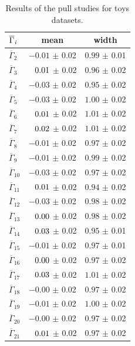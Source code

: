 \begin{table}[!tb]
\caption{Results of the pull studies for toys datasets.}
\centering
\begin{tabular}{l|c|c}
$\overline{\Gamma}_{\it{i}}$ & mean & width \\ 
\hline
$\overline{\Gamma}_{2}$ & $-0.01$ $\pm$ 0.02 & $0.99$ $\pm$ 0.01 \\ 
$\overline{\Gamma}_{3}$ & $\hphantom{-}0.01$ $\pm$ 0.02 & $0.96$ $\pm$ 0.02 \\ 
$\overline{\Gamma}_{4}$ & $-0.03$ $\pm$ 0.02 & $0.95$ $\pm$ 0.02 \\ 
$\overline{\Gamma}_{5}$ & $-0.03$ $\pm$ 0.02 & $1.00$ $\pm$ 0.02 \\ 
$\overline{\Gamma}_{6}$ & $\hphantom{-}0.01$ $\pm$ 0.02 & $1.01$ $\pm$ 0.02 \\ 
$\overline{\Gamma}_{7}$ & $\hphantom{-}0.02$ $\pm$ 0.02 & $1.01$ $\pm$ 0.02 \\ 
$\overline{\Gamma}_{8}$ & $-0.01$ $\pm$ 0.02 & $0.97$ $\pm$ 0.02 \\ 
$\overline{\Gamma}_{9}$ & $-0.01$ $\pm$ 0.02 & $0.99$ $\pm$ 0.02 \\ 
$\overline{\Gamma}_{10}$ & $-0.03$ $\pm$ 0.02 & $0.97$ $\pm$ 0.02 \\ 
$\overline{\Gamma}_{11}$ & $\hphantom{-}0.01$ $\pm$ 0.02 & $0.94$ $\pm$ 0.02 \\ 
$\overline{\Gamma}_{12}$ & $-0.03$ $\pm$ 0.02 & $0.98$ $\pm$ 0.02 \\ 
$\overline{\Gamma}_{13}$ & $\hphantom{-}0.00$ $\pm$ 0.02 & $0.98$ $\pm$ 0.02 \\ 
$\overline{\Gamma}_{14}$ & $\hphantom{-}0.03$ $\pm$ 0.02 & $0.95$ $\pm$ 0.01 \\ 
$\overline{\Gamma}_{15}$ & $-0.01$ $\pm$ 0.02 & $0.97$ $\pm$ 0.01 \\ 
$\overline{\Gamma}_{16}$ & $\hphantom{-}0.00$ $\pm$ 0.02 & $0.97$ $\pm$ 0.02 \\ 
$\overline{\Gamma}_{17}$ & $\hphantom{-}0.03$ $\pm$ 0.02 & $1.01$ $\pm$ 0.02 \\ 
$\overline{\Gamma}_{18}$ & $-0.00$ $\pm$ 0.02 & $0.97$ $\pm$ 0.02 \\ 
$\overline{\Gamma}_{19}$ & $-0.01$ $\pm$ 0.02 & $1.00$ $\pm$ 0.02 \\ 
$\overline{\Gamma}_{20}$ & $-0.00$ $\pm$ 0.02 & $0.97$ $\pm$ 0.02 \\ 
$\overline{\Gamma}_{21}$ & $\hphantom{-}0.01$ $\pm$ 0.02 & $0.97$ $\pm$ 0.02 \\ 
\end{tabular}

\end{table}
